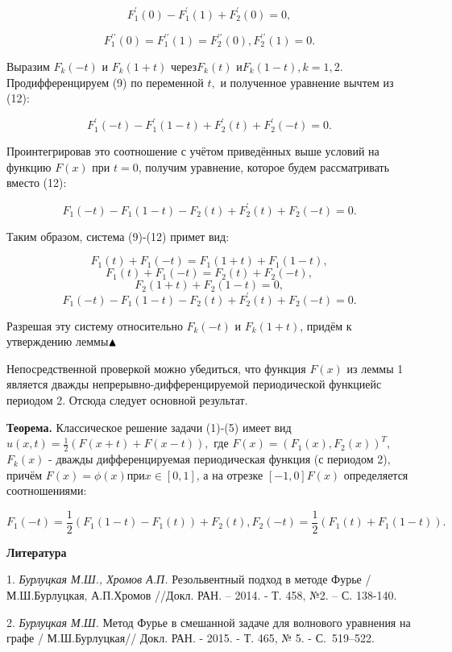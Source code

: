 \[F_{1}^{{'} } \left(0\right)-F_{1}^{{'} } \left(1\right)+F_{2}^{{'} } \left(0\right)=0,\]

\[F_{1}^{{'} {'} } \left(0\right)=F_{1}^{{'} {'} } \left(1\right)=F_{2}^{{'} {'} } \left(0\right),F_{2}^{{'} {'} } \left(1\right)=0.\]

Выразим $F_{k} \left(-t\right)$ и $F_{k} \left(1+t\right)$ через$F_{k} \left(t\right)$ и$F_{k} \left(1-t\right),$$k=1,2.$ Продифференцируем  (9)  по переменной $t,$ и полученное уравнение вычтем из (12):


$$F_{1}^{{'} } \left(-t\right)-F_{1}^{{'} } \left(1-t\right)+F_{2}^{{'} } \left(t\right)+F_{2}^{{'} } \left(-t\right)=0. $$


Проинтегрировав это соотношение с учётом приведённых выше условий на функцию $F(x)$ при $t=0$, получим уравнение, которое будем рассматривать вместо (12):

\[F_{1} \left(-t\right)-F_{1} \left(1-t\right)-F_{2} \left(t\right)+F_{2}^{{'} } \left(t\right)+F_{2} \left(-t\right)=0.\]

Таким образом, система (9)-(12) примет вид:


$$F_{1} \left(t\right)+F_{1} \left(-t\right)=F_{1} \left(1+t\right)+F_{1} \left(1-t\right), $$
$$F_{1} \left(t\right)+F_{1} \left(-t\right)=F_{2} \left(t\right)+F_{2} \left(-t\right),$$
$$F_{2} \left(1+t\right)+F_{2} \left(1-t\right)=0,$$
$${F_{1} \left(-t\right)-F_{1} \left(1-t\right)-F_{2} \left(t\right)+F_{2}^{{'} } \left(t\right)+F_{2} \left(-t\right)=0.} $$


Разрешая эту систему относительно $F_{k} \left(-t\right)$ и $F_{k} \left(1+t\right)$, придём к утверждению леммы${\rm \blacktriangle }$

Непосредственной проверкой можно убедиться, что функция $F(x)$ из леммы 1 является дважды непрерывно-дифференцируемой периодической функциейс периодом 2. Отсюда следует основной результат.

\textbf{Теорема.} Классическое решение задачи (1)-(5) имеет вид $u\left(x,t\right)=\frac{1}{2} \left(F(x+t)+F\left(x-t\right)\right),$ где $F\left(x\right)=\left(F_{1} \left(x\right),F_{2} \left(x\right)\right)^{T} ,$$F_{k} \left(x\right)$ - дважды дифференцируемая периодическая функция (с периодом 2), причём $F\left(x\right)=\phi \left(x\right)$при$x\in \left[0,1\right]$, а на отрезке $\left[-1,0\right]$$F\left(x\right)$ определяется соотношениями:

\[F_{1} \left(-t\right)=\frac{1}{2} \left(F_{1} \left(1-t\right. \right)-\left. F_{1} \left(t\right)\right)+F_{2} \left(t\right),F_{2} \left(-t\right)=\frac{1}{2} \left(F_{1} \left(t\right. \right)+\left. F_{1} \left(1-t\right)\right).\]



\smallskip \centerline{\bf Литература}\nopagebreak

1. {\it Бурлуцкая М.Ш., Хромов А.П.} Резольвентный подход в методе Фурье / М.Ш.Бурлуцкая, А.П.Хромов //Докл. РАН. -- 2014. - Т. 458, №2. -- С. 138-140.

2. {\it Бурлуцкая М.Ш.} Метод Фурье в смешанной задаче для волнового уравнения на графе / М.Ш.Бурлуцкая// Докл. РАН. - 2015. - Т. 465, № 5. - С.~519--522.
